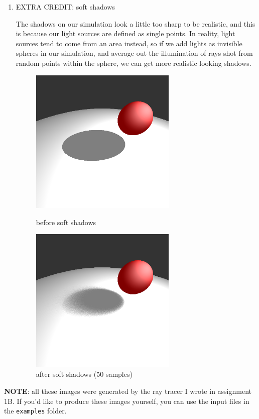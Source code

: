 \documentclass{assignment}
\begin{document}
\begin{enumerate}
 \item EXTRA CREDIT: soft shadows

       The shadows on our simulation look a little too sharp to be realistic, and this is because our light sources are defined as single points.  In reality, light sources tend to come from an area instead, so if we add lights as invisible spheres in our simulation, and average out the illumination of rays shot from random points within the sphere, we can get more realistic looking shadows.

       \begin{figure}[H]
        \centering
        \begin{minipage}[c]{0.46\linewidth}
         \centering
         \includegraphics[width=7cm]{img/softshadows_before.png}
         \caption{before soft shadows}
        \end{minipage}
        \begin{minipage}[c]{0.46\linewidth}
         \centering
         \includegraphics[width=7cm]{img/softshadows_after.png}
         \caption{after soft shadows (50 samples)}
        \end{minipage}
       \end{figure}
\end{enumerate}

\textbf{NOTE}: all these images were generated by the ray tracer I wrote in assignment 1B.  If you'd like to produce these images yourself, you can use the input files in the \verb|examples| folder.
\end{document}
